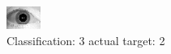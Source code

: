 \begin{figure}[h!]
\begin{center}
\includegraphics[width=0.60\columnwidth]{figures/ID1725_class_3_target_2.png}
\end{center}
\caption{ Classification: 3 actual target: 2}
\label{fig:ID1725_class_3_target_2}
\end{figure}
